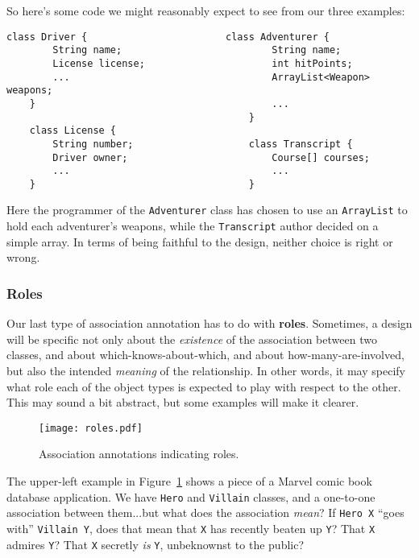 So here's some code we might reasonably expect to see from our three examples:

\begin{Verbatim}[fontsize=\small,samepage=true,frame=single]
    class Driver {                        class Adventurer {
        String name;                          String name;
        License license;                      int hitPoints;
        ...                                   ArrayList<Weapon> weapons;
    }                                         ...
                                          }
    class License {
        String number;                    class Transcript {
        Driver owner;                         Course[] courses;
        ...                                   ...
    }                                     }
\end{Verbatim}

Here the programmer of the \texttt{Adventurer} class has chosen to use an
\texttt{ArrayList} to hold each adventurer's weapons, while the
\texttt{Transcript} author decided on a simple array. In terms of being
faithful to the design, neither choice is right or wrong.

\subsubsection{Roles}

Our last type of association annotation has to do with \textbf{roles}.
Sometimes, a design will be specific not only about the \textit{existence} of
the association between two classes, and about which-knows-about-which, and
about how-many-are-involved, but also the intended \textit{meaning} of the
relationship. In other words, it may specify what role each of the object
types is expected to play with respect to the other. This may sound a bit
abstract, but some examples will make it clearer.

\begin{figure}[ht]
\centering
\texttt{[image: roles.pdf]}   %
\caption{Association annotations indicating roles.}
\label{fig:roles}
\end{figure}

The upper-left example in Figure~\ref{fig:roles} shows a piece of a Marvel
comic book database application. We have \texttt{Hero} and \texttt{Villain}
classes, and a one-to-one association between them...but what does the
association \textit{mean}? If \texttt{Hero X} ``goes with'' \texttt{Villain Y},
does that mean that \texttt{X} has recently beaten up \texttt{Y}? That
\texttt{X} admires \texttt{Y}? That \texttt{X} secretly \textit{is}
\texttt{Y}, unbeknownst to the public?

